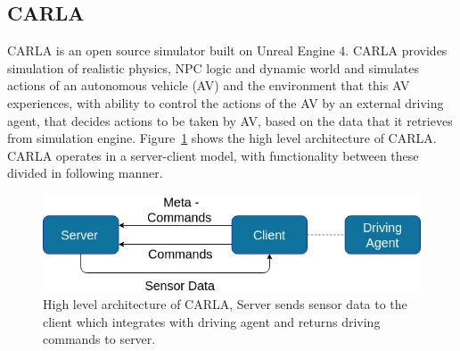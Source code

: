 \subsection{CARLA} \label{ri-carla}
CARLA is an open source simulator built on Unreal Engine 4. CARLA provides simulation of realistic physics, NPC logic and dynamic world and simulates actions of an autonomous vehicle (AV) and the environment that this AV experiences, with ability to control the actions of the AV by an external driving agent,  that decides actions to be taken by AV, based on the data that it retrieves from simulation engine. Figure~\ref{fig:carla_arch} shows the high level architecture of CARLA. CARLA operates in a server-client model, with functionality between these divided in following manner.



\begin{figure}  [h]
	\vspace{-0.5em}
	\centering
	\includegraphics[scale=0.4]{CARLA_block}
	\vspace{-0.5em}
	\caption{High level architecture of CARLA, Server sends sensor data to the client which integrates with driving agent and returns driving commands to server.}
	\label{fig:carla_arch}
	\vspace{-1.5em}
\end{figure}

\bigskip


